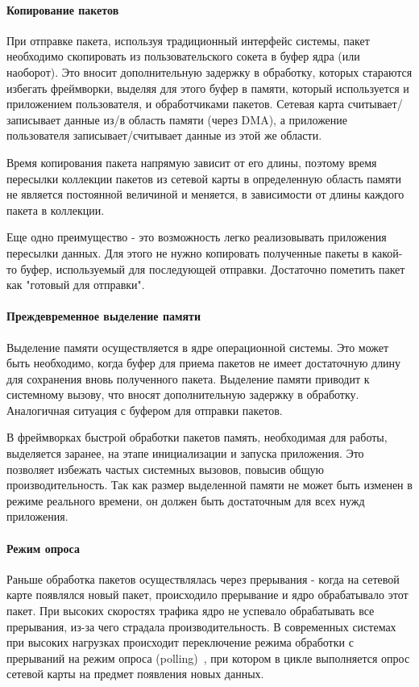 \paragraph{Копирование пакетов}

При отправке пакета, используя традиционный интерфейс системы, пакет необходимо скопировать из пользовательского сокета в буфер ядра (или наоборот). Это вносит дополнительную задержку в обработку, которых стараются избегать фреймворки, выделяя для этого буфер в памяти, который используется и приложением пользователя, и обработчиками пакетов. Сетевая карта считывает/записывает данные из/в область памяти (через DMA), а приложение пользователя записывает/считывает данные из этой же области.

Время копирования пакета напрямую зависит от его длины, поэтому время пересылки коллекции пакетов из сетевой карты в определенную область памяти не является постоянной величиной и меняется, в зависимости от длины каждого пакета в коллекции.

Еще одно преимущество - это возможность легко реализовывать приложения пересылки данных. Для этого не нужно копировать полученные пакеты в какой-то буфер, используемый для последующей отправки. Достаточно пометить пакет как "готовый для отправки".

\paragraph{Преждевременное выделение памяти}

Выделение памяти осуществляется в ядре операционной системы. Это может быть необходимо, когда буфер для приема пакетов не имеет достаточную длину для сохранения вновь полученного пакета. Выделение памяти приводит к системному вызову, что вносят дополнительную задержку в обработку. Аналогичная ситуация с буфером для отправки пакетов.

В фреймворках быстрой обработки пакетов память, необходимая для работы, выделяется заранее, на этапе инициализации и запуска приложения. Это позволяет избежать частых системных вызовов, повысив общую производительность. Так как размер выделенной памяти не может быть изменен в режиме реального времени, он должен быть достаточным для всех нужд приложения.

\paragraph{Режим опроса}

Раньше обработка пакетов осуществлялась через прерывания - когда на сетевой карте появлялся новый пакет, происходило прерывание и ядро обрабатывало этот пакет. При высоких скоростях трафика  ядро не успевало обрабатывать все прерывания, из-за чего страдала производительность. В современных системах при высоких нагрузках происходит переключение режима обработки с прерываний на режим опроса (polling)~\cite{modern_os}, при котором в цикле выполняется опрос сетевой карты на предмет появления новых данных.

